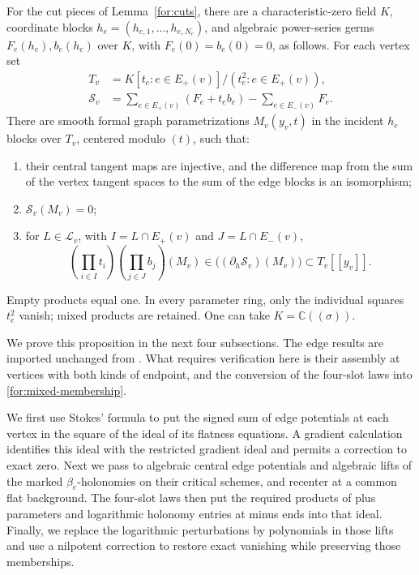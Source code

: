 \begin{proposition}
\label{for:formal-data}
For the cut pieces of Lemma~\ref{for:cuts}, there are a
characteristic-zero field $K$, coordinate blocks
$h_e=(h_{e,1},\ldots,h_{e,N_e})$, and algebraic power-series germs
$F_e(h_e),b_e(h_e)$ over $K$, with $F_e(0)=b_e(0)=0$, as follows.
For each vertex set
\begin{equation}
\label{for:vertex-potentials}
 \begin{split}
 T_v&=K[t_e:e\in E_+(v)]/(t_e^2:e\in E_+(v)),\\
 \mathcal S_v&=\sum_{e\in E_+(v)}(F_e+t_eb_e)
                  -\sum_{e\in E_-(v)}F_e.
 \end{split}
\end{equation}
There are smooth formal graph parametrizations $M_v(y_v,t)$ in the
incident $h_e$ blocks over $T_v$, centered modulo $(t)$, such that:
\begin{enumerate}
\item their central tangent maps are injective, and the difference map
from the sum of the vertex tangent spaces to the sum of the edge blocks
is an isomorphism;
\item $\mathcal S_v(M_v)=0$;
\item for $L\in\mathcal L_v$, with $I=L\cap E_+(v)$ and
$J=L\cap E_-(v)$,
\begin{equation}
\label{for:mixed-membership}
 \left(\prod_{i\in I}t_i\right)
 \left(\prod_{j\in J}b_j\right)(M_v)
 \in\bigl((\partial_h\mathcal S_v)(M_v)\bigr)
       \subset T_v[[y_v]].
\end{equation}
\end{enumerate}
Empty products equal one.  In every parameter ring, only the individual
squares $t_e^2$ vanish; mixed products are retained.  One can take
$K=\mathbb C((\sigma))$.
\end{proposition}

We prove this proposition in the next four subsections.  The edge
results are imported unchanged from \cite[Proposition~4.5 and
Theorem~5.1]{MT}.  What requires verification here is their assembly
at vertices with both kinds of endpoint, and the conversion of the
four-slot laws into \eqref{for:mixed-membership}.

We first use Stokes' formula to put the signed sum of edge potentials
at each vertex in the square of the ideal of its flatness equations.
A gradient calculation identifies this ideal with the restricted
gradient ideal and permits a correction to exact zero.  Next we pass
to algebraic central edge potentials and algebraic lifts of the marked
$\beta_e$-holonomies on their critical schemes, and recenter at a
common flat background.  The four-slot laws then put the required
products of plus parameters and logarithmic holonomy entries at minus
ends into that ideal.
Finally, we replace the logarithmic perturbations by polynomials in
those lifts and use a nilpotent correction to restore exact vanishing
while preserving those memberships.

